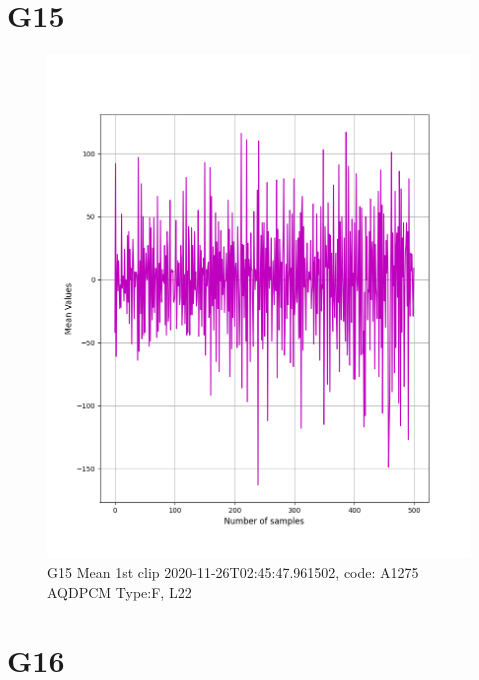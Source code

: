\documentclass[hidelinks, 12pt, a4paper]{article}
\begin{document}
\section{G15}

\begin{figure}[h!]
\centering
	\includegraphics[height=.4\textheight, width=\textwidth]{assets/session1/g15.png}
    \caption{G15 Mean 1st clip 2020-11-26T02:45:47.961502, code: A1275 AQDPCM Type:F, L22}
\end{figure}

\section{G16}
\end{document}
